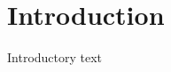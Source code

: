 \def\module{Module} %
\def\typist{Typist} %
\def\lecturer{Lecturer} %
\def\term{Term} %
\def\cover{ %
$$
\textbf{\Huge COVER}
$$
}
\def\syllabus{Syllabus} %
\def\thm{section} %



\setcounter{section}{-1}






\section{Introduction}


Introductory text


